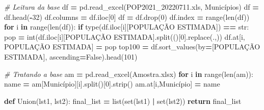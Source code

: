 \documentclass[
  12,
  dvipsnames]{article}
\newenvironment{Shaded}{\begin{snugshade}}{\end{snugshade}}
\newcommand{\BuiltInTok}[1]{#1}
\newcommand{\CommentTok}[1]{\textcolor[rgb]{0.56,0.35,0.01}{\textit{#1}}}
\newcommand{\ControlFlowTok}[1]{\textcolor[rgb]{0.13,0.29,0.53}{\textbf{#1}}}
\newcommand{\DecValTok}[1]{\textcolor[rgb]{0.00,0.00,0.81}{#1}}
\newcommand{\KeywordTok}[1]{\textcolor[rgb]{0.13,0.29,0.53}{\textbf{#1}}}
\newcommand{\NormalTok}[1]{#1}
\newcommand{\OperatorTok}[1]{\textcolor[rgb]{0.81,0.36,0.00}{\textbf{#1}}}
\newcommand{\StringTok}[1]{\textcolor[rgb]{0.31,0.60,0.02}{#1}}
\newcommand{\VariableTok}[1]{\textcolor[rgb]{0.00,0.00,0.00}{#1}}
\begin{document}
\begin{Shaded}
\begin{Highlighting}[]
\CommentTok{\# Leitura da base}
\NormalTok{df }\OperatorTok{=}\NormalTok{ pd.read\_excel(}\StringTok{\textquotesingle{}POP2021\_20220711.xls\textquotesingle{}}\NormalTok{, }\StringTok{\textquotesingle{}Municípios\textquotesingle{}}\NormalTok{)}
\NormalTok{df }\OperatorTok{=}\NormalTok{ df.head(}\OperatorTok{{-}}\DecValTok{32}\NormalTok{)}
\NormalTok{df.columns }\OperatorTok{=}\NormalTok{ df.iloc[}\DecValTok{0}\NormalTok{]}
\NormalTok{df }\OperatorTok{=}\NormalTok{ df.drop(}\DecValTok{0}\NormalTok{)}
\NormalTok{df.index }\OperatorTok{=} \BuiltInTok{range}\NormalTok{(}\BuiltInTok{len}\NormalTok{(df))}
\ControlFlowTok{for}\NormalTok{ i }\KeywordTok{in} \BuiltInTok{range}\NormalTok{(}\BuiltInTok{len}\NormalTok{(df)):}
    \ControlFlowTok{if} \BuiltInTok{type}\NormalTok{(df.iloc[i][}\StringTok{\textquotesingle{}POPULAÇÃO ESTIMADA\textquotesingle{}}\NormalTok{]) }\OperatorTok{==} \BuiltInTok{str}\NormalTok{:}
\NormalTok{        pop }\OperatorTok{=} \BuiltInTok{int}\NormalTok{(df.iloc[i][}\StringTok{\textquotesingle{}POPULAÇÃO ESTIMADA\textquotesingle{}}\NormalTok{].split(}\StringTok{\textquotesingle{}(\textquotesingle{}}\NormalTok{)[}\DecValTok{0}\NormalTok{].replace(}\StringTok{\textquotesingle{}.\textquotesingle{}}\NormalTok{,}\StringTok{\textquotesingle{}\textquotesingle{}}\NormalTok{))}
\NormalTok{        df.at[i, }\StringTok{\textquotesingle{}POPULAÇÃO ESTIMADA\textquotesingle{}}\NormalTok{] }\OperatorTok{=}\NormalTok{ pop}
\NormalTok{top100 }\OperatorTok{=}\NormalTok{ df.sort\_values(by}\OperatorTok{=}\NormalTok{[}\StringTok{\textquotesingle{}POPULAÇÃO ESTIMADA\textquotesingle{}}\NormalTok{], ascending}\OperatorTok{=}\VariableTok{False}\NormalTok{).head(}\DecValTok{101}\NormalTok{)}

\CommentTok{\# Tratando a base}
\NormalTok{am }\OperatorTok{=}\NormalTok{ pd.read\_excel(}\StringTok{\textquotesingle{}Amostra.xlsx\textquotesingle{}}\NormalTok{)}
\ControlFlowTok{for}\NormalTok{ i }\KeywordTok{in} \BuiltInTok{range}\NormalTok{(}\BuiltInTok{len}\NormalTok{(am)):}
\NormalTok{    name }\OperatorTok{=}\NormalTok{ am[}\StringTok{\textquotesingle{}Município\textquotesingle{}}\NormalTok{][i].split(}\StringTok{\textquotesingle{}{-}\textquotesingle{}}\NormalTok{)[}\DecValTok{0}\NormalTok{].strip()}
\NormalTok{    am.at[i,}\StringTok{\textquotesingle{}Município\textquotesingle{}}\NormalTok{] }\OperatorTok{=}\NormalTok{ name}

\KeywordTok{def}\NormalTok{ Union(lst1, lst2):}
\NormalTok{    final\_list }\OperatorTok{=} \BuiltInTok{list}\NormalTok{(}\BuiltInTok{set}\NormalTok{(lst1) }\OperatorTok{|} \BuiltInTok{set}\NormalTok{(lst2))}
    \ControlFlowTok{return}\NormalTok{ final\_list}


\end{Highlighting}
\end{Shaded}
\end{document}

